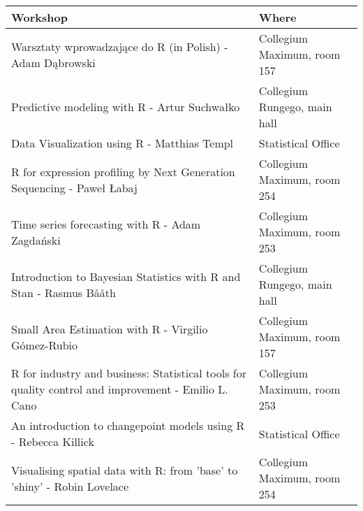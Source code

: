 \begingroup\fontsize{9pt}{10pt}\selectfont
\begin{longtable}{|p{12cm}|p{3cm}|}
  \hline
Workshop & Where \\ 
  \hline
Warsztaty wprowadzające do R (in Polish) - Adam Dąbrowski & Collegium Maximum, room 157 \\ 
  Predictive modeling with R - Artur Suchwałko & Collegium Rungego, main hall \\ 
  Data Visualization using R - Matthias Templ & Statistical Office \\ 
  R for expression profiling by Next Generation Sequencing - Paweł Łabaj & Collegium Maximum, room 254 \\ 
  Time series forecasting with R - Adam Zagdański & Collegium Maximum, room 253 \\ 
  Introduction to Bayesian Statistics with R and Stan - Rasmus Bååth & Collegium Rungego, main hall \\ 
  Small Area Estimation with R - Virgilio Gómez-Rubio & Collegium Maximum, room 157 \\ 
  R for industry and business: Statistical tools for quality control and improvement - Emilio L. Cano & Collegium Maximum, room 253 \\ 
  An introduction to changepoint models using R - Rebecca Killick & Statistical Office \\ 
  Visualising spatial data with R: from 'base' to 'shiny' - Robin Lovelace & Collegium Maximum, room 254 \\ 
   \hline
\hline
\end{longtable}
\endgroup
